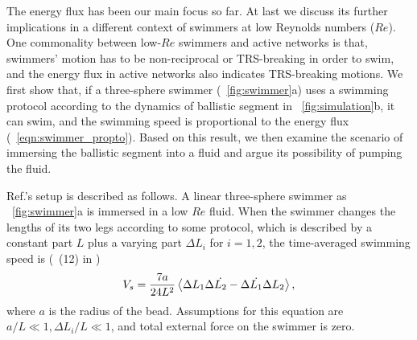 \documentclass[
 preprint,
 preprintnumbers,
 amsmath,amssymb,
 aps,
 pre,
 longbibliography,
 10pt, twocolumn
]{revtex4-1}
\begin{document}
The energy flux has been our main focus so far. At last we discuss its further implications in a different context of swimmers at low Reynolds numbers ($Re$).
One commonality between low-$Re$ swimmers and active networks is that, swimmers' motion has to be non-reciprocal or TRS-breaking in order to swim, and the energy flux in active networks also indicates TRS-breaking motions.
We first show that, if a three-sphere swimmer \cite{Golestanian2008AnalyticNumber} (\figurename~\ref{fig:swimmer}a) uses a swimming protocol according to the dynamics of ballistic segment in \figurename~\ref{fig:simulation}b, it can swim, and the swimming speed is proportional to the energy flux (\eqnname~\eqref{eqn:swimmer_propto}).
Based on this result, we then examine the scenario of immersing the ballistic segment into a fluid and argue its possibility of pumping the fluid.

Ref.\cite{Golestanian2008AnalyticNumber}'s setup is described as follows. A linear three-sphere swimmer as \figurename~\ref{fig:swimmer}a is immersed in a low $Re$ fluid. When the swimmer changes the lengths of its two legs according to some protocol, which is described by a constant part $L$ plus a varying part $\Delta L_i$ for $i=1,2$, the time-averaged swimming speed is (\eqnname~(12) in \cite{Golestanian2008AnalyticNumber})
\begin{equation} \label{eqn:swimmer_speed}
    V_s = \frac{7a}{24L^2} \expval{\Delta L_1 \Delta \Dot{L_2} - \Delta \Dot{L_1} \Delta{L_2}},
\end{equation}
where $a$ is the radius of the bead. Assumptions for this equation are $a/L \ll 1, \Delta L_i/L \ll 1$, and total external force on the swimmer is zero.
\end{document}
